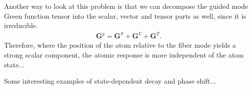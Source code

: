 \documentclass[preprint,aps,pra,onecolumn]{revtex4-1} %
\begin{document}
Another way to look at this problem is that we can decompose the guided mode Green function tensor into the scalar, vector and tensor parts as well, since it is irreducible.
\begin{align}
\mathbf{G}^g=\mathbf{G}^S+\mathbf{G}^V+\mathbf{G}^T.
\end{align}
Therefore, where the position of the atom relative to the fiber mode yields a strong scalar component, the atomic response is more independent of the atom state... 

Some interesting examples of state-dependent decay and phase shift...



%
%

\ifwindows
	
\else
	
\fi
\end{document}
